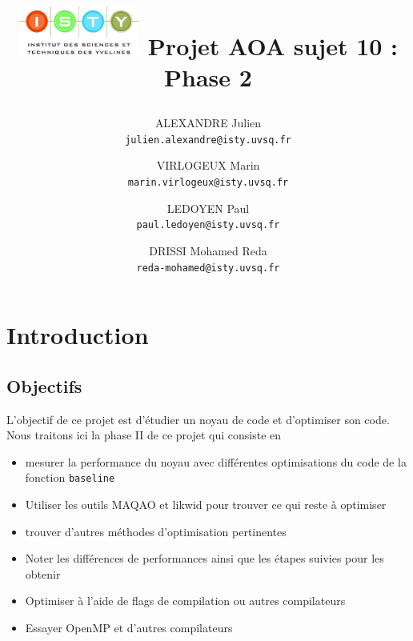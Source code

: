 \documentclass{report}
\begin{document}
\title{
  \begin{minipage}\linewidth
      \centering
      \includegraphics[width=40mm]{resources/01.png}\vskip 20pt
      Projet AOA sujet 10 : Phase 2
      \vskip 5pt
      \author{
        ALEXANDRE Julien \\
        \texttt{julien.alexandre@isty.uvsq.fr}
      \and
        VIRLOGEUX Marin \\
        \texttt{marin.virlogeux@isty.uvsq.fr}
      \and
        LEDOYEN Paul \\
        \texttt{paul.ledoyen@isty.uvsq.fr}
      \and
        DRISSI Mohamed Reda \\
        \texttt{reda-mohamed@isty.uvsq.fr}
      }
    \end{minipage}
}
\maketitle
\newpage
\tableofcontents
\newpage
\section{Introduction}
 \subsection{Objectifs}
  	L'objectif de ce projet est d'étudier un noyau de code et d'optimiser son code. Nous traitons ici la phase II de ce projet qui consiste en
  	\begin{itemize}
  	\item mesurer la performance du noyau avec différentes optimisations du code de la fonction \texttt{baseline}
    \item Utiliser les outils MAQAO et likwid pour trouver ce qui reste à optimiser
  	\item trouver d'autres méthodes d'optimisation pertinentes
	  \item Noter les différences de performances ainsi que les étapes suivies pour les obtenir
    \item Optimiser à l'aide de flags de compilation ou autres compilateurs
	  \item Essayer OpenMP et d'autres compilateurs
  	\end{itemize}
\end{document}
